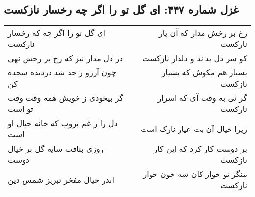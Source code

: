 \begin{center}
\section*{غزل شماره ۴۴۷: ای گل تو را اگر چه رخسار نازکست}
\label{sec:0447}
\begin{longtable}{l p{0.5cm} r}
ای گل تو را اگر چه که رخسار نازکست
&&
رخ بر رخش مدار که آن یار نازکست
\\
در دل مدار نیز که رخ بر رخش نهی
&&
کو سر دل بداند و دلدار نازکست
\\
چون آرزو ز حد شد دزدیده سجده کن
&&
بسیار هم مکوش که بسیار نازکست
\\
گر بیخودی ز خویش همه وقت وقت تو است
&&
گر نی به وقت آی که اسرار نازکست
\\
دل را ز غم بروب که خانه خیال او است
&&
زیرا خیال آن بت عیار نازک است
\\
روزی بتافت سایه گل بر خیال دوست
&&
بر دوست کار کرد که این کار نازکست
\\
اندر خیال مفخر تبریز شمس دین
&&
منگر تو خوار کان شه خون خوار نازکست
\\
\end{longtable}
\end{center}
